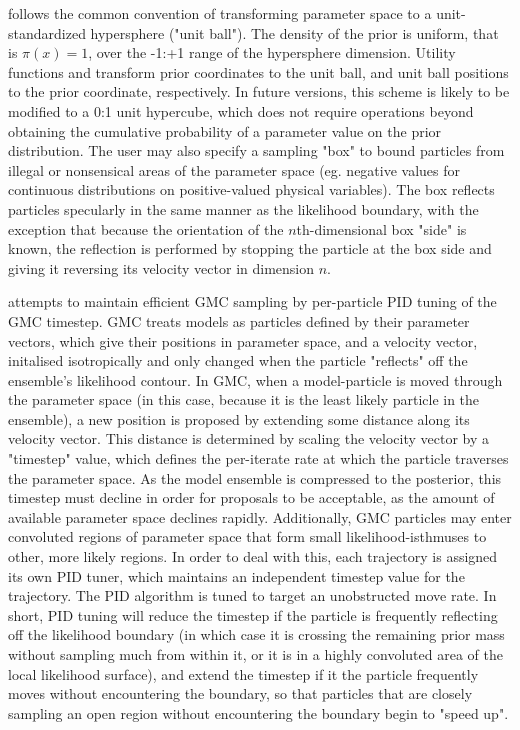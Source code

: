  follows the common convention of transforming parameter space to a unit-standardized hypersphere ("unit ball"). The density of the prior is uniform, that is $\pi(x) = 1$, over the -1:+1 range of the hypersphere dimension. Utility functions  and  transform prior coordinates to the unit ball, and unit ball positions to the prior coordinate, respectively. In future versions, this scheme is likely to be modified to a 0:1 unit hypercube, which does not require operations beyond obtaining the cumulative probability of a parameter value on the prior distribution. The user may also specify a sampling "box" to bound particles from illegal or nonsensical areas of the parameter space (eg. negative values for continuous distributions on positive-valued physical variables). The box reflects particles specularly in the same manner as the likelihood boundary, with the exception that because the orientation of the $n$th-dimensional box "side" is known, the reflection is performed by stopping the particle at the box side and giving it reversing its velocity vector in dimension $n$. 

 attempts to maintain efficient GMC sampling by per-particle PID tuning of the GMC timestep. GMC treats models as particles defined by their parameter vectors, which give their positions in parameter space, and a velocity vector, initalised isotropically and only changed when the particle "reflects" off the ensemble's likelihood contour. In GMC, when a model-particle is moved through the parameter space (in this case, because it is the least likely particle in the ensemble), a new position is proposed by extending some distance along its velocity vector. This distance is determined by scaling the velocity vector by a "timestep" value, which defines the per-iterate rate at which the particle traverses the parameter space. As the model ensemble is compressed to the posterior, this timestep must decline in order for proposals to be acceptable, as the amount of available parameter space declines rapidly. Additionally, GMC particles may enter convoluted regions of parameter space that form small likelihood-isthmuses to other, more likely regions. In order to deal with this, each trajectory is assigned its own PID tuner, which maintains an independent timestep value for the trajectory. The PID algorithm is tuned to target an unobstructed move rate. In short, PID tuning will reduce the timestep if the particle is frequently reflecting off the likelihood boundary (in which case it is crossing the remaining prior mass without sampling much from within it, or it is in a highly convoluted area of the local likelihood surface), and extend the timestep if it the particle frequently moves without encountering the boundary, so that particles that are closely sampling an open region without encountering the boundary begin to "speed up".

